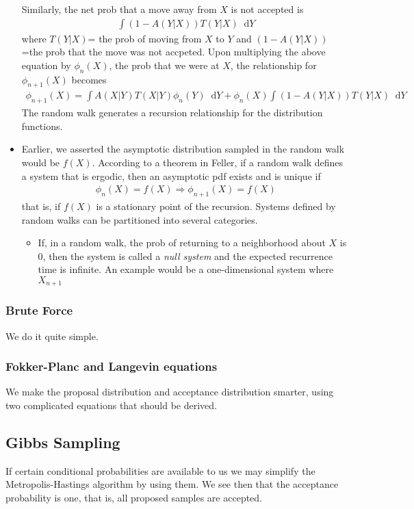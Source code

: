 \documentclass[twoside,english]{uiofysmaster}
\newcommand*\dif{\mathop{}\!\mathrm{d}}
\begin{document}
\begin{itemize}
	Similarly, the net prob that a move away from $X$ is not accepted is
	\begin{align}
		\int (1-A(Y|X)) T(Y|X) \dif Y
	\end{align}
	where $T(Y|X)$= the prob of moving from $X$ to $Y$ and $(1-A(Y|X))$ =the prob that the move was not accpeted. Upon multiplying the above equation by $\phi_n (X)$, the prob that we were at $X$, the relationship for $\phi_{n+1} (X)$ becomes
	\begin{align}
		\phi_{n+1} (X) = \int A(X|Y) T(X|Y) \phi_n (Y) \dif Y
		+ \phi_n(X) \int (1-A(Y|X)) T(Y|X) \dif Y
	\end{align}
	The random walk generates a recursion relationship for the distribution functions.
	\item Earlier, we asserted the asymptotic distribution sampled in the random walk would be $f(X)$. According to a theorem in Feller, if a random walk defines a system that is ergodic, then an asymptotic pdf exists and is unique if
	\begin{align}
		\phi_n (X) = f(X) \Rightarrow \phi_{n+1} (X) = f(X)
	\end{align}
	that is, if $f(X)$ is a stationary point of the recursion. Systems defined by random walks can be partitioned into several categories.
	\begin{itemize}
		\item If, in a random walk, the prob of returning to a neighborhood about $X$ is 0, then the system is called a \textit{null system} and the expected recurrence time is infinite. An example would be a one-dimensional system where $X_{n+1}$ 
	\end{itemize}
\end{itemize}
 \cite{Kalos2008}

\subsubsection{Brute Force}
We do it quite simple.

\subsubsection{Fokker-Planc and Langevin equations}
We make the proposal distribution and acceptance distribution smarter, using two complicated equations that should be derived.

\subsection{Gibbs Sampling}
If certain conditional probabilities are available to us we may simplify the Metropolis-Hastings algorithm by using them. We see then that the acceptance probability is one, that is, all proposed samples are accepted.
\end{document}
